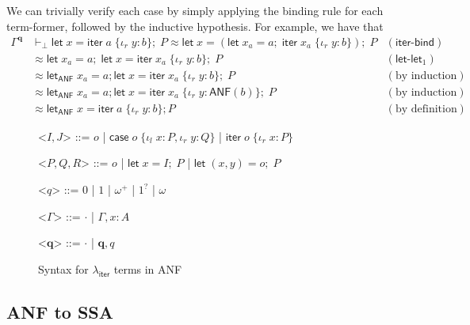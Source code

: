 \documentclass[acmsmall,screen,review]{acmart}
\newcommand{\mb}[1]{\ensuremath{\mathbf{#1}}}
\newcommand{\ms}[1]{\ensuremath{\mathsf{#1}}}
\newcommand{\lto}{:}
\newcommand{\linl}[1]{\iota_l\;{#1}}
\newcommand{\linr}[1]{\iota_r\;{#1}}
\newcommand{\letexpr}[3]{\ensuremath{\ms{let}\;#1 = #2;\;#3}}
\newcommand{\caseexpr}[5]{\ms{case}\;#1\;\{\linl{#2} \lto #3, \linr{#4} \lto #5\}}
\newcommand{\liter}[3]{\ms{iter}\;#1\;\{ \linr{#2} \lto #3 \}}
\newcommand{\brle}[1]{{\textsf{#1}}}
\newcommand{\toanf}[1]{\ms{ANF}(#1)}
\newcommand{\anflet}[3]{\ms{let}_{\ms{ANF}}\;#1 = #2; #3}
\newcommand{\subiterexp}{\texorpdfstring{\(\lambda_{\ms{iter}}\)}{lambda-iter}}
\newcommand{\zeroq}{0}
\newcommand{\oneq}{1}
\newcommand{\delq}{1^?}
\newcommand{\cpyq}{\omega^+}
\newcommand{\topq}{\omega}
\begin{document}
We can trivially verify each case by simply applying the binding rule for each term-former, followed
by the inductive hypothesis. For example, we have that
\begin{align*}
  \Gamma^{\mb{q}} & \vdash_\bot
    \letexpr{x}{\liter{a}{y}{b}}{P} \approx \letexpr{x}{(\letexpr{x_a}{a}{\liter{x_a}{y}{b}})}{P} 
      & (\brle{iter-bind}) \\
    &\approx \letexpr{x_a}{a}{\letexpr{x}{\liter{x_a}{y}{b}}{P}}
      & (\brle{let-let$_1$}) \\
    & \approx \anflet{x_a}{a}{\letexpr{x}{\liter{x_a}{y}{b}}{P}} & (\text{by induction}) \\
    & \approx \anflet{x_a}{a}{\letexpr{x}{\liter{x_a}{y}{\toanf{b}}}{P}} & (\text{by induction}) \\
    & \approx \anflet{x}{\liter{a}{y}{b}}{P} & (\text{by definition})
\end{align*}

\begin{figure}
  \begin{grammar}
    <\(I, J\)> ::= 
    \(o\)
    \;|\; \(\caseexpr{o}{x}{P}{y}{Q}\)
    \;|\; \(\liter{o}{x}{P}\)

    <\(P, Q, R\)> ::=
    \(o\)
    \;|\; \(\letexpr{x}{I}{P}\)
    \;|\; \(\letexpr{(x, y)}{o}{P}\)
    
    <\(q\)> ::= \(\zeroq\) | \(\oneq\) | \(\cpyq\) | \(\delq\) | \(\topq\)

    <\(\Gamma\)> ::= \(\cdot\) \;|\; \(\Gamma, x : A\)

    <\(\mb{q}\)> ::= \(\cdot\) \;|\; \(\mb{q}, q\)
  \end{grammar}
  \caption{Syntax for \subiterexp{} terms in ANF} \Description{}
  \label{fig:anf-syntax}
\end{figure}

\subsection{ANF to SSA}
\end{document}
